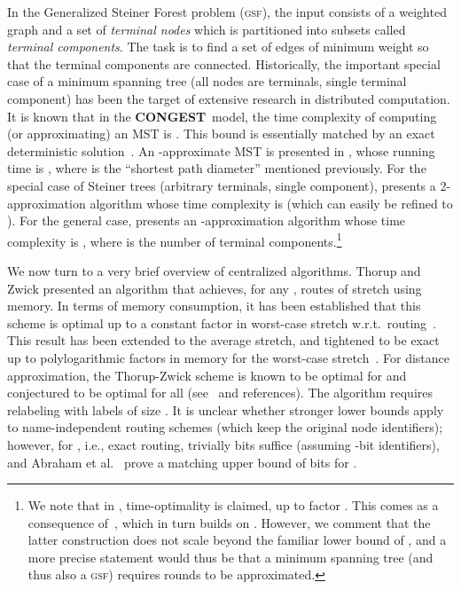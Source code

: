 \documentclass[letterpaper,11pt]{article}
\newcommand{\CONGEST}{\textbf{CONGEST}}
\newcommand{\gsf}{\textsc{gsf}}
\begin{document}
In the Generalized Steiner Forest problem (\gsf), the input consists of a
weighted graph and a set of \emph{terminal nodes} which is partitioned into
subsets called \emph{terminal components}. The task is to find a set of edges of
minimum weight so that the terminal components are connected. Historically, the
important special case of a minimum spanning tree (all nodes are terminals,
single terminal component) has been the target of extensive research in
distributed computation. It is known that in the \CONGEST\ model, the time
complexity of computing (or approximating) an MST is
 \cite{DHKNPPW-11,Elkin-MST,PelegR-00}. This bound
is essentially matched by an exact deterministic solution~\cite{GKP93,KP98}. An
-approximate MST is presented in \cite{KP-08}, whose running time
is , where  is the ``shortest path diameter'' mentioned
previously. For the special case of Steiner trees (arbitrary terminals, single
component), \cite{CF05} presents a 2-approximation algorithm whose time
complexity is  (which can easily be refined to ).
For the general case, \cite{KKMPT} presents an -approximation
algorithm whose time complexity is , where 
is the number of terminal components.\footnote{We note that in \cite{KKMPT}, time-optimality is claimed, up
  to factor . This comes as a consequence of~\cite{KP-08},
  which in turn builds on \cite{Elkin-MST}.  However, we comment that the latter
  construction does not scale beyond the familiar lower bound of
  , and a more precise statement would thus be that a
  minimum spanning tree (and thus also a \gsf) requires
   rounds to be approximated.  }


We now turn to a very brief overview of centralized algorithms. Thorup and Zwick \cite{TZ-routing} presented an algorithm that achieves,
for any , routes of stretch  using 
memory. In terms of memory consumption, it has been established that this scheme is optimal up to a constant factor in worst-case stretch w.r.t.\
routing~\cite{PU89}. This result has been extended to the average
stretch, and tightened to be exact up to polylogarithmic factors in memory for
the worst-case stretch~\cite{abraham06}. For distance approximation, the
Thorup-Zwick scheme is known to be optimal for  and conjectured to be
optimal for all  (see~\cite{zwick01} and references). The algorithm
requires relabeling with labels of size .
It is unclear whether stronger lower bounds apply to name-independent routing
schemes (which keep the original node identifiers); however, for ,
i.e., exact routing, trivially  bits suffice (assuming
-bit identifiers), and Abraham et al.~\cite{abraham08}
prove a matching upper 
bound of  bits for .
\end{document}
